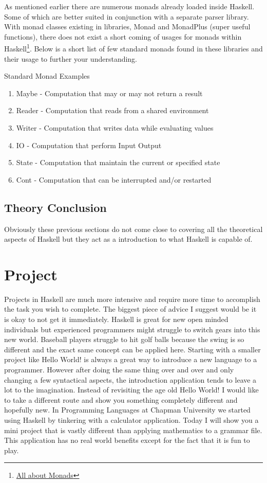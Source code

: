 \documentclass{article}
\begin{document}
\medskip\noindent As mentioned earlier there are numerous monads already loaded inside Haskell. Some of which are better suited in conjunction with a separate parser library. With monad classes existing in libraries, Monad and MonadPlus (super useful functions), there does not exist a short coming of usages for monads within Haskell\footnote{\href{https://wiki.haskell.org/All_About_Monads}{All about Monads}}. Below is a short list of few standard monads found in these libraries and their usage to further your understanding.

\medskip
\caption{Standard Monad Examples}
\begin{enumerate}
    \item Maybe - Computation that may or may not return a result
    \item Reader - Computation that reads from a shared environment
    \item Writer - Computation that writes data while evaluating values
    \item IO - Computation that perform Input Output
    \item State - Computation that maintain the current or specified state
    \item Cont - Computation that can be interrupted and/or restarted
\end{enumerate}

\subsection{Theory Conclusion}
Obviously these previous sections do not come close to covering all the theoretical aspects of Haskell but they act as a introduction to what Haskell is capable of.
    

\section{Project}

Projects in Haskell are much more intensive and require more time to accomplish the task you wish to complete. The biggest piece of advice I suggest would be it is okay to not get it immediately. Haskell is great for new open minded individuals but experienced programmers might struggle to switch gears into this new world. Baseball players struggle to hit golf balls because the swing is so different and the exact same concept can be applied here. Starting with a smaller project like Hello World! is always a great way to introduce a new language to a programmer. However after doing the same thing over and over and only changing a few syntactical aspects, the introduction application tends to leave a lot to the imagination. Instead of revisiting the age old Hello World! I would like to take a different route and show you something completely different and hopefully new. In Programming Languages at Chapman University we started using Haskell by tinkering with a calculator application. Today I will show you a mini project that is vastly different than applying mathematics to a grammar file. This application has no real world benefits except for the fact that it is fun to play. 
    
\end{document}

